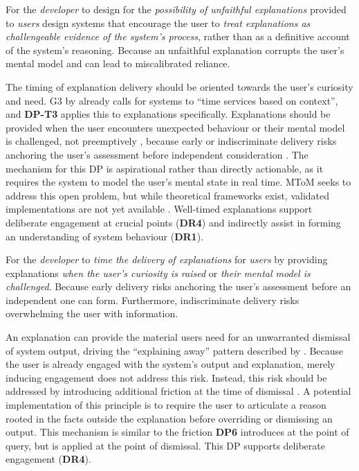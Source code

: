     {For the \textit{developer} to design for the \textit{possibility of unfaithful explanations} provided to \textit{users}}
    {design systems that encourage the user to \textit{treat explanations as challengeable evidence of the system's process}, rather than as a definitive account of the system's reasoning.}
    {Because an unfaithful explanation corrupts the user's mental model and can lead to miscalibrated reliance.}

The timing of explanation delivery should be oriented towards the user's curiosity and need. G3 by \textcite{Amershi2019} already calls for systems to \enquote{time services based on context}, and \textbf{DP-T3} applies this to explanations specifically. Explanations should be provided when the user encounters unexpected behaviour or their mental model is challenged, not preemptively \parencite{Miller2019,Hoffman2023}, because early or indiscriminate delivery risks anchoring the user's assessment before independent consideration \parencite{Jussupow2021}. The mechanism for this \ac{DP} is aspirational rather than directly actionable, as it requires the system to model the user's mental state in real time. \ac{MToM} seeks to address this open problem, but while theoretical frameworks exist, validated implementations are not yet available  \parencite{Wang2021, Wang2024a}. Well-timed explanations support deliberate engagement at crucial points (\textbf{DR4}) and indirectly assist in forming an understanding of system behaviour (\textbf{DR1}).

    {For the \textit{developer} to \textit{time the delivery of explanations} for \textit{users}}
    {by providing explanations \textit{when the user's curiosity is raised} or \textit{their mental model is challenged}.}
    {Because early delivery risks anchoring the user's assessment before an independent one can form. Furthermore, indiscriminate delivery risks overwhelming the user with information.}

An explanation can provide the material users need for an unwarranted dismissal of system output, driving the \enquote{explaining away} pattern described by \textcite{Jussupow2021}. Because the user is already engaged with the system's output and explanation, merely inducing engagement does not address this risk. Instead, this risk should be addressed by introducing additional friction at the time of dismissal \parencite[cf.][]{Buinca2021}. A potential implementation of this principle is to require the user to articulate a reason rooted in the facts outside the explanation before overriding or dismissing an output. This mechanism is similar to the friction \textbf{DP6} introduces at the point of query, but is applied at the point of dismissal. This \ac{DP} supports deliberate engagement (\textbf{DR4}).

